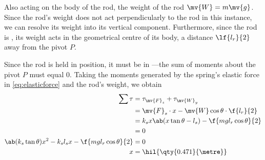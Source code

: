 Also acting on the body of the rod, the weight of the rod \(\mv{W} =
m\mv{g}\). Since
the rod's weight does not act perpendicularly to the rod in this instance, we
can resolve its weight into its vertical component. Furthermore, since the rod
is , its weight acts in the geometrical centre of its
body, a distance \(\lf{l_r}{2}\)
away from the pivot \(P\).

Since the rod is held in position, it must be in ---the
sum of moments about the pivot \(P\) must equal \(0\).
Taking the moments generated by the spring's elastic force in
\cref{eq:elasticforce} and the rod's weight, we obtain
\begin{align*}
  \sum\tau &= \tau_{\mv{F}_s} + \tau_{\mv{W}_y} \\
  &= \mv{F}_s\cdot x - \mv{W}\cos\theta\cdot\f{l_r}{2} \\
  &= k_sx\ab(x\tan\theta - l_s) - \f{mgl_r\cos\theta}{2} \\
  &= 0 \\
  \ab(k_s\tan\theta)x^2 - k_sl_sx -\f{mgl_r\cos\theta}{2} &= 0\\
  x
  &= \hil{\qty{0.471}{\metre}}
\end{align*}

